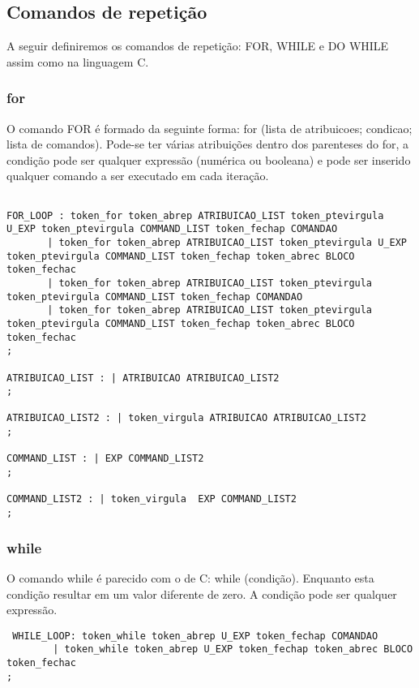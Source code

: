 \documentclass[a4paper,10pt]{article}
\begin{document}
\subsection{Comandos de repetição}
A seguir definiremos os comandos de repetição: FOR, WHILE e DO WHILE assim como na linguagem C.
\subsubsection{for}

O comando FOR é formado da seguinte forma: for (lista de atribuicoes; condicao; lista de comandos). Pode-se ter várias atribuições dentro dos parenteses do for,
a condição pode ser qualquer expressão (numérica ou booleana) e pode ser inserido qualquer comando a ser executado em cada iteração.

\begin{verbatim}

FOR_LOOP : token_for token_abrep ATRIBUICAO_LIST token_ptevirgula U_EXP token_ptevirgula COMMAND_LIST token_fechap COMANDAO
	   | token_for token_abrep ATRIBUICAO_LIST token_ptevirgula U_EXP token_ptevirgula COMMAND_LIST token_fechap token_abrec BLOCO token_fechac
	   | token_for token_abrep ATRIBUICAO_LIST token_ptevirgula token_ptevirgula COMMAND_LIST token_fechap COMANDAO
	   | token_for token_abrep ATRIBUICAO_LIST token_ptevirgula token_ptevirgula COMMAND_LIST token_fechap token_abrec BLOCO token_fechac
;

ATRIBUICAO_LIST : | ATRIBUICAO ATRIBUICAO_LIST2
;

ATRIBUICAO_LIST2 : | token_virgula ATRIBUICAO ATRIBUICAO_LIST2
;

COMMAND_LIST : | EXP COMMAND_LIST2
;

COMMAND_LIST2 : | token_virgula  EXP COMMAND_LIST2
;
\end{verbatim}

\subsubsection{while}

O comando while é parecido com o de C: while (condição). Enquanto esta condição resultar em um valor diferente de zero. A condição pode ser qualquer expressão.

\begin{verbatim}
 WHILE_LOOP: token_while token_abrep U_EXP token_fechap COMANDAO
	    | token_while token_abrep U_EXP token_fechap token_abrec BLOCO token_fechac
;
\end{verbatim}
\end{document}
